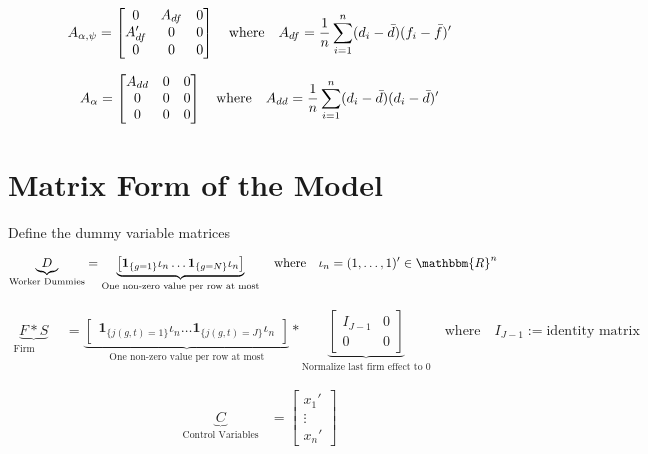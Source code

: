 \documentclass[12pt]{article}
\begin{document}
\begin{align*}
A_{\alpha,\psi} = \begin{bmatrix}
0 & A_{df} & 0\\
A_{df}' & 0 & 0\\
0 & 0 & 0
\end{bmatrix} \quad \text{where} \quad A_{df} = \frac{1}{n} \sum_{i=1}^n (d_i - \Bar{d})(f_i - \Bar{f})'
\end{align*}

\begin{align*}
A_{\alpha} = \begin{bmatrix}
A_{dd} & 0 & 0\\
0 & 0 & 0\\
0 & 0 & 0
\end{bmatrix} \quad \text{where} \quad A_{dd} = \frac{1}{n} \sum_{i=1}^n (d_i - \Bar{d})(d_i - \Bar{d})'
\end{align*}



\section{Matrix Form of the Model}

Define the dummy variable matrices

\begin{align*}
    \underbrace{D}_\text{Worker Dummies} &= \underbrace{\begin{bmatrix} \boldsymbol{1}_{\{g=1\}} \iota_n \dots \boldsymbol{1}_{\{g=N\}} \iota_n  \end{bmatrix}}_\text{One non-zero value per row at most} \quad \text{where} \quad \iota_n = (1, \dots, 1)' \in \mathbbm{R}^n
\end{align*}

\begin{align*}
    \underbrace{F*S}_\text{Firm Dummies} &= \underbrace{\begin{bmatrix} \boldsymbol{1}_{\{j(g,t)=1\}} \iota_n \dots \boldsymbol{1}_{\{j(g,t)=J\}} \iota_n  \end{bmatrix}}_\text{One non-zero value per row at most} * \underbrace{\begin{bmatrix} I_{J-1} & 0 \\ 0 & 0 \end{bmatrix}}_\text{Normalize last firm effect to 0}
    \quad \text{where} \quad I_{J-1}:= \text{identity matrix}
\end{align*}


\begin{align*}
    \underbrace{C}_\text{Control Variables} &= \begin{bmatrix} x_1' \\ \vdots \\ x_n'  \end{bmatrix}
\end{align*}
\end{document}
